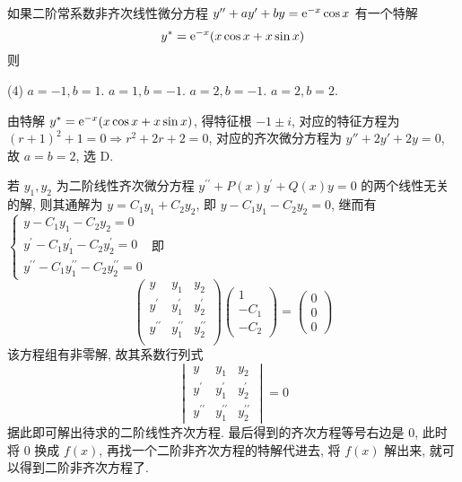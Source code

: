 \begin{example}
    如果二阶常系数非齐次线性微分方程 $y''+ay'+by=\mathrm{e} ^{-x}\cos x$ 有一个特解 $$y^*=\mathrm{e} ^{-x}(x\cos x+x\sin x)$$ 则
    \begin{tasks}(4)
        \task $a=-1,b=1.$
        \task $a=1,b=-1.$
        \task $a=2,b=-1.$
        \task $a=2,b=2.$
    \end{tasks}
\end{example}
\begin{solution}
    由特解 $y^*=\mathrm{e} ^{-x}(x\cos x+x\sin x)$, 得特征根 $-1\pm i$, 对应的特征方程为 $(r+1)^2+1=0\Rightarrow r^2+2r+2=0$, 对应的齐次微分方程为 $y''+2y'+2y=0$, 故 $a=b=2$, 选 D.
\end{solution}

若 $ y_{1}, y_{2} $ 为二阶线性齐次微分方程 $ y^{\prime \prime}+P(x) y^{\prime}+Q(x) y=0 $ 的两个线性无关的解, 则其通解为 $ y=C_{1} y_{1}+C_{2} y_{2} $, 即 $ y-C_{1} y_{1}-C_{2} y_{2}=0 $, 继而有
$
    \begin{cases}
        y-C_{1} y_{1}-C_{2} y_{2}=0                            \\
        y^{\prime}-C_{1} y_{1}^{\prime}-C_{2} y_{2}^{\prime}=0 \\
        y^{\prime \prime}-C_{1} y_{1}^{\prime \prime}-C_{2} y_{2}^{\prime \prime}=0
    \end{cases}
$
即 $$\begin{pmatrix}  y & y_{1} & y_{2} \\ y^{\prime} & y_{1}^{\prime} & y_{2}^{\prime} \\ y^{\prime \prime} & y_{1}^{\prime \prime} & y_{2}^{\prime \prime}\\\end{pmatrix} \begin{pmatrix}1 \\ -C_{1} \\ -C_{2}\end{pmatrix}=\begin{pmatrix}0 \\ 0 \\ 0\end{pmatrix}$$
该方程组有非零解, 故其系数行列式
$$
    \begin{vmatrix}y                 & y_{1}                 & y_{2}                 \\
               y^{\prime}        & y_{1}^{\prime}        & y_{2}^{\prime}        \\
               y^{\prime \prime} & y_{1}^{\prime \prime} & y_{2}^{\prime \prime}\end{vmatrix}=0
$$
据此即可解出待求的二阶线性齐次方程. 最后得到的齐次方程等号右边是 0, 此时将 0 换成 $ f(x) $, 再找一个二阶非齐次方程的特解代进去, 将 $ f(x) $ 解出来, 就可以得到二阶非齐次方程了.


